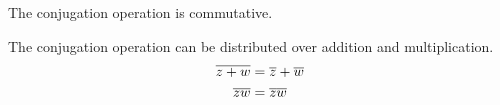\begin{propertylist}
\item The conjugation operation is commutative.
\item The conjugation operation can be distributed over addition and multiplication.\label{prop:Complex_Conjugate_Split}
  \begin{align*}
    \overline{z+w} &= \overline{z} + \overline{w} \\
    \overline{zw} &= \overline{z} \overline{w}
  \end{align*}
\end{propertylist}

